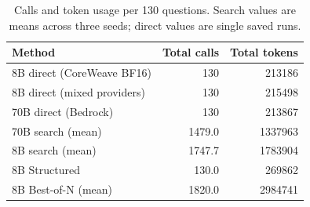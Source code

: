 \begin{table}[ht]
\centering
\caption{Calls and token usage per 130 questions. Search values are means across three seeds; direct values are single saved runs.}
\begin{tabular}{lrr}
\toprule
Method & Total calls & Total tokens \\
\midrule
8B direct (CoreWeave BF16) & 130 & 213186 \\
8B direct (mixed providers) & 130 & 215498 \\
70B direct (Bedrock) & 130 & 213867 \\
70B search (mean) & 1479.0 & 1337963 \\
8B search (mean) & 1747.7 & 1783904 \\
8B Structured & 130.0 & 269862 \\
8B Best-of-N (mean) & 1820.0 & 2984741 \\
\bottomrule
\end{tabular}
\end{table}